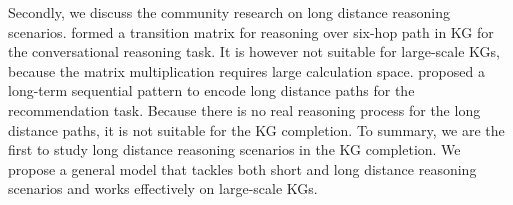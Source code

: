 Secondly, we discuss the community research on long distance reasoning scenarios.
\cite{tuan-etal-2019-dykgchat} formed a transition matrix for reasoning over six-hop path in KG for the conversational reasoning task.
It is however not suitable for large-scale KGs, because the matrix multiplication requires large calculation space.
\cite{wang2019explainable} proposed a long-term sequential pattern to encode long distance paths
for the recommendation task.
Because there is no real reasoning process for the long distance paths, it is not suitable for the KG completion.
To summary, we are the first to study long distance reasoning scenarios in the KG completion.
We propose a general model that tackles both short and long distance reasoning scenarios and works effectively on large-scale KGs.




